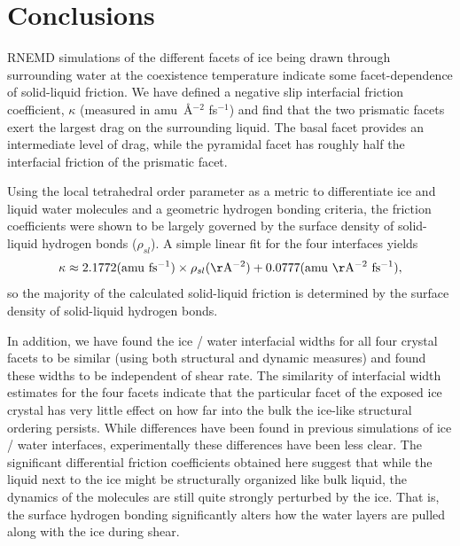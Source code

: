 \section{Conclusions}
RNEMD simulations of the different facets of ice being drawn through
surrounding water at the coexistence temperature indicate some
facet-dependence of solid-liquid friction.  We have defined a negative
slip interfacial friction coefficient, $\kappa$ (measured in
amu~\AA$^{-2}$ fs$^{-1}$) and find that the two prismatic facets exert
the largest drag on the surrounding liquid.  The basal facet provides
an intermediate level of drag, while the pyramidal facet has roughly
half the interfacial friction of the prismatic facet.

Using the local tetrahedral order parameter as a metric to
differentiate ice and liquid water molecules and a geometric hydrogen
bonding criteria, the friction coefficients were shown to be largely
governed by the surface density of solid-liquid hydrogen bonds
($\rho_{sl}$).  A simple linear fit for the four interfaces yields
\begin{equation}
\kappa \approx 2.1772 \mathrm{(amu~fs^{-1})} \times \rho_{sl} \mathrm{(\AA^{-2})}  + 0.0777 \mathrm{(amu~\AA^{-2}~fs^{-1})},
\end{equation}
so the majority of the calculated solid-liquid friction is determined
by the surface density of solid-liquid hydrogen bonds.

In addition, we have found the ice / water interfacial widths for all
four crystal facets to be similar (using both structural and dynamic
measures) and found these widths to be independent of shear rate.  The
similarity of interfacial width estimates for the four facets indicate
that the particular facet of the exposed ice crystal has very little
effect on how far into the bulk the ice-like structural ordering
persists.  While differences have been found in previous simulations
of ice / water interfaces\cite{Hayward2001,Hayward2002},
experimentally these differences have been less
clear.\cite{Beaglehole1993} The significant differential friction
coefficients obtained here suggest that while the liquid next to the
ice might be structurally organized like bulk liquid, the dynamics of
the molecules are still quite strongly perturbed by the ice.  That is,
the surface hydrogen bonding significantly alters how the water layers
are pulled along with the ice during shear.



